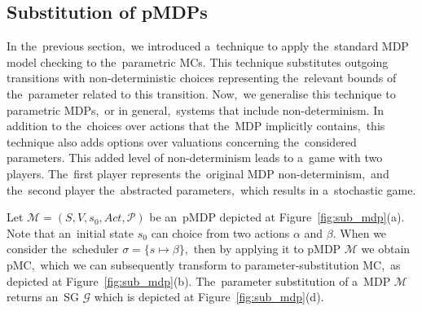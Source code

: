 \subsection{Substitution of pMDPs}
In the~previous section,~we introduced a~technique to apply the~standard MDP model checking to the~parametric MCs. 
This technique substitutes outgoing transitions with non-deterministic choices representing the~relevant bounds of the~parameter related to this transition.
Now,~we generalise this technique to parametric MDPs,~or in general,~systems that include non-determinism.
In addition to the~choices over actions that the~MDP implicitly contains,~this technique also adds options over valuations concerning the~considered parameters.
This added level of non-determinism leads to a~game with two players.
The~first player represents the~original MDP non-determinism,~and the~second player the~abstracted parameters,~which results in a~stochastic game.

\begin{example}
Let $\mathcal{M} = (S, V, s_0, Act, \mathcal{P})$ be an~pMDP depicted at Figure~\ref{fig:sub_mdp}(a).
Note that an~initial state $s_0$ can choice from two actions $\alpha$ and $\beta$.
When we consider the~scheduler $\sigma = \{ s \mapsto \beta \}$,~then by applying it to pMDP $\mathcal{M}$ we obtain pMC,~which we can subsequently transform to parameter-substitution MC,~as depicted at Figure~\ref{fig:sub_mdp}(b).
The~parameter substitution of a~MDP $\mathcal{M}$ returns an~SG $\mathcal{G}$ which is depicted at Figure~\ref{fig:sub_mdp}(d).
\end{example}

